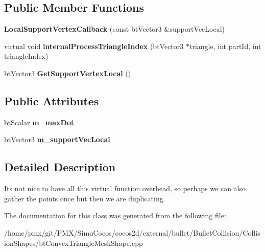 \subsection*{Public Member Functions}
\begin{DoxyCompactItemize}
\item 
\mbox{\label{classLocalSupportVertexCallback_ada150b522495aaeb7092a63995e25edd}} 
{\bfseries Local\+Support\+Vertex\+Callback} (const bt\+Vector3 \&support\+Vec\+Local)
\item 
\mbox{\label{classLocalSupportVertexCallback_afa65b300345ae9c76b79dd552832eb10}} 
virtual void {\bfseries internal\+Process\+Triangle\+Index} (bt\+Vector3 $\ast$triangle, int part\+Id, int triangle\+Index)
\item 
\mbox{\label{classLocalSupportVertexCallback_a3da8f1b5c1b2443a2f27cd6593d2bfc1}} 
bt\+Vector3 {\bfseries Get\+Support\+Vertex\+Local} ()
\end{DoxyCompactItemize}
\subsection*{Public Attributes}
\begin{DoxyCompactItemize}
\item 
\mbox{\label{classLocalSupportVertexCallback_a3483eea79bc6d99098df59836617ee6f}} 
bt\+Scalar {\bfseries m\+\_\+max\+Dot}
\item 
\mbox{\label{classLocalSupportVertexCallback_a9a18c48f1c83568d7d69bf68adc9d836}} 
bt\+Vector3 {\bfseries m\+\_\+support\+Vec\+Local}
\end{DoxyCompactItemize}


\subsection{Detailed Description}
It\textquotesingle{}s not nice to have all this virtual function overhead, so perhaps we can also gather the points once but then we are duplicating 

The documentation for this class was generated from the following file\+:\begin{DoxyCompactItemize}
\item 
/home/pmx/git/\+P\+M\+X/\+Simu\+Cocos/cocos2d/external/bullet/\+Bullet\+Collision/\+Collision\+Shapes/bt\+Convex\+Triangle\+Mesh\+Shape.\+cpp\end{DoxyCompactItemize}
